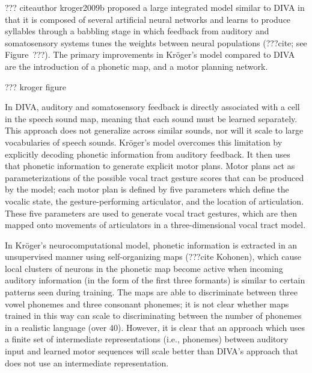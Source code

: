 ??? citeauthor kroger2009b proposed
a large integrated model
similar to DIVA in that
it is composed of
several artificial neural networks
and learns to produce syllables
through a babbling stage
in which feedback from
auditory and somatosensory systems
tunes the weights between
neural populations
(???cite; see Figure~???).
The primary improvements in
Kr\"{o}ger's model compared to DIVA
are the introduction of a phonetic map,
and a motor planning network.

??? kroger figure

In DIVA, auditory and somatosensory feedback
is directly associated with a cell
in the speech sound map,
meaning that each sound must be learned separately.
This approach does not generalize across
similar sounds, nor will it scale
to large vocabularies of speech sounds.
Kr\"{o}ger's model overcomes this limitation
by explicitly decoding phonetic information
from auditory feedback.
It then uses that phonetic information
to generate explicit motor plans.
Motor plans act as parameterizations
of the possible vocal tract gesture scores
that can be produced by the model;
each motor plan is defined by
five parameters which define
the vocalic state,
the gesture-performing articulator,
and the location of articulation.
These five parameters are used
to generate vocal tract gestures,
which are then mapped onto
movements of articulators
in a three-dimensional vocal tract model.

In Kr\"{o}ger's neurocomputational model,
phonetic information is extracted
in an unsupervised manner
using self-organizing maps
(???cite Kohonen),
which cause
local clusters of neurons
in the phonetic map become active
when incoming auditory information
(in the form of the first three formants)
is similar to certain patterns
seen during training.
The maps are able to
discriminate between three vowel phonemes
and three consonant phonemes;
it is not clear whether
maps trained in this way
can scale to discriminating
between the number of phonemes
in a realistic language (over 40).
However, it is clear that an approach
which uses a finite set of intermediate representations
(i.e., phonemes)
between auditory input
and learned motor sequences
will scale better than DIVA's approach
that does not use an intermediate representation.

